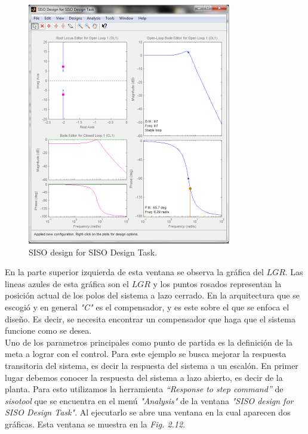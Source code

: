 \documentclass[a4paper,12pt,twoside]{proyectotanquesecci}
\begin{document}
\begin{figure}[h]
\centering
\includegraphics[scale=0.7]{Ventana5}
\renewcommand{\figurename}{Fig.}
\caption{SISO design for SISO Design Task.}
\label{SISO design for SISO Design Task.}
\end{figure}

En la parte superior izquierda de esta ventana se observa la gráfica del $LGR$. Las lineas azules de esta gráfica son el $LGR$ y los puntos rosados representan   la posición actual de los polos del sistema a lazo cerrado. En la arquitectura que se escogió y en general \textit{"C"} es el compensador, y es este sobre el que se enfoca el diseño. Es decir, se necesita encontrar un compensador que haga que el sistema funcione como se desea. \\

Uno de los parametros principales como punto de partida es la definición de la meta a lograr con el control. Para este ejemplo se busca mejorar la respuesta transitoria del sistema, es decir la respuesta del sistema a un escalón. En primer lugar debemos conocer la respuesta del sistema a lazo abierto, es decir de la planta. Para esto utilizamos la herramienta \textit{“Response to step command”} de \textit{sisotool} que se encuentra en el menú \textit{"Analysis"} de la ventana  \textit{"SISO design for SISO Design Task"}. Al ejecutarlo se abre una ventana en la cual aparecen dos gráficas. Esta ventana se muestra en la \textit{Fig. 2.12}. \\
\end{document}
